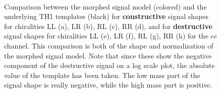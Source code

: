 {\begin{figure}[htp]
 \\
\vspace{-0.3em}
\caption{Comparison between the morphed signal model (colored) and the underlying TH1 templates (black) for \textbf{constructive} signal shapes for chiralities LL (a), LR (b), RL (c), RR (d), and for \textbf{destructive} signal shapes for chiralities LL (e), LR (f), RL (g), RR (h) for the $ee$ channel. This comparison is both of the shape and normalization of the morphed signal model. Note that since these show the negative component of the destructive signal on a log scale plot, the absolute value of the template has been taken. The low mass part of the signal shape is really negative, while the high mass part is positive.}
\label{fig:ciSigModelTemplateCompEe}
\end{figure}
\clearpage
}

